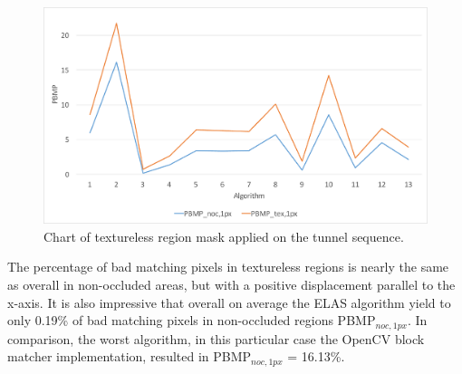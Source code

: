 \begin{figure}[h!]
\centering
\includegraphics[width=1.0\textwidth]{src/images/evaluation/plots/05-tunnel-pbmp-tex-1.pdf}
\caption[Chart of textureless region mask]{Chart of textureless region mask applied on the tunnel sequence.}
\label{fig:eval-plots-pbmp-tex1}
\end{figure}

\noindent The percentage of bad matching pixels in textureless regions is nearly the same as overall in non-occluded areas, but with a positive displacement parallel to the x-axis.
It is also impressive that overall on average the ELAS algorithm yield to only 0.19\% of bad matching pixels in non-occluded regions PBMP$_{noc,1px}$.
In comparison, the worst algorithm, in this particular case the OpenCV block matcher implementation, resulted in PBMP$_{noc,1px}$ = 16.13\%.

\begin{table}[h!]
\centering
{}
\caption[Result table for tunnel scene]{Result table for tunnel scene of Cambridge dataset}
\label{tab:eval:tex:tunnel:overview}
\end{table}


